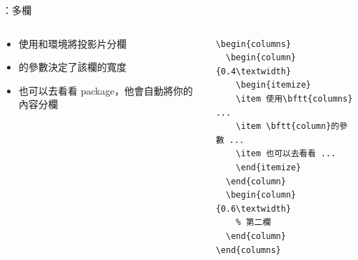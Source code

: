 \documentclass{beamer}
\begin{document}
\begin{frame}[fragile]{\insertsection：多欄}
\begin{columns}
\begin{column}{0.4\textwidth}
\begin{itemize}
\item 使用和環境將投影片分欄
\item {}的參數決定了該欄的寬度
\item 也可以去看看 package，他會自動將你的內容分欄
\end{itemize}
\end{column}
\begin{column}{0.6\textwidth}
\begin{verbatim}
\begin{columns}
  \begin{column}{0.4\textwidth}
    \begin{itemize}
    \item 使用\bftt{columns} ...
    \item \bftt{column}的參數 ...
    \item 也可以去看看 ...
    \end{itemize}
  \end{column}
  \begin{column}{0.6\textwidth}
    % 第二欄
  \end{column}
\end{columns}
\end{verbatim}
\end{column}
\end{columns}
\end{frame}
\end{document}
